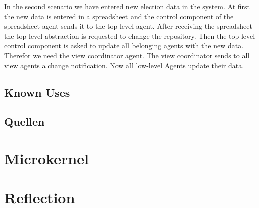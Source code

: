 \documentclass{scrbook}
\begin{document}

In the second scenario we have entered new election data in the system.  At first the new data is entered in a spreadsheet and the control component of the spreadsheet agent sends it to the top-level agent. After receiving the spreadsheet the top-level abstraction is requested to change the repository. Then the top-level control component is asked to update all belonging agents with the new data. Therefor we need the view coordinator agent. The view coordinator sends to all view agents a change notification. Now all low-level Agents update their data.  


\section{Known Uses}


\section{Quellen}



\chapter{Microkernel}
\chapter{Reflection}
\end{document}
